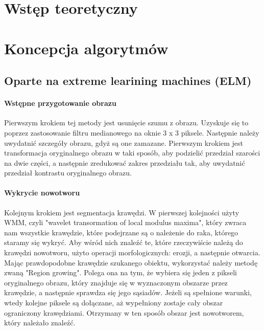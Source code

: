 \documentclass{sprawozdanie-agh}
\begin{document}

\stronatytulowa{}

\section{Wstęp teoretyczny}

\section{Koncepcja algorytmów}
\subsection{Oparte na extreme learining machines (ELM)}
\paragraph{Wstępne przygotowanie obrazu\\}
Pierwszym krokiem tej metody jest usunięcie szumu z obrazu. Uzyskuje się to poprzez zastosowanie filtru medianowego na oknie 3 x 3 piksele. 
Następnie należy uwydatnić szczegóły obrazu, gdyż są one zamazane. Pierwszym krokiem jest transformacja oryginalnego obrazu w taki sposób, aby podzielić przedział szarości na dwie części, a następnie zredukować zakres przedziału tak, aby uwydatnić przedział kontrastu oryginalnego obrazu.

\paragraph{Wykrycie nowotworu\\}
Kolejnym krokiem jest segmentacja krawędzi. W pierwszej kolejności użyty WMM, czyli "wavelet transormation of local modulus maxima", który zwraca nam wszystkie krawędzie, które podejrzane są o należenie do raka, którego staramy się wykryć. Aby wśród nich znaleźć te, które rzeczywiście należą do krawędzi nowotworu, użyto operacji morfologicznych: erozji, a następnie otwarcia. Mając prawdopodobne krawędzie szukanego obiektu, wykorzystać należy metodę zwaną "Region growing". Polega ona na tym, że wybiera się jeden z pikseli oryginalnego obrazu, który znajduje się w wyznaczonym obszarze przez krawędzie, a następnie sprawdza się jego sąsiadów. Jeżeli są spełnione warunki, wtedy kolejne piksele są dołączane, aż wypełniony zostaje cały obszar ograniczony krawędziami. Otrzymany w ten sposób obszar jest nowotworem, który należało znaleźć.
\end{document}
